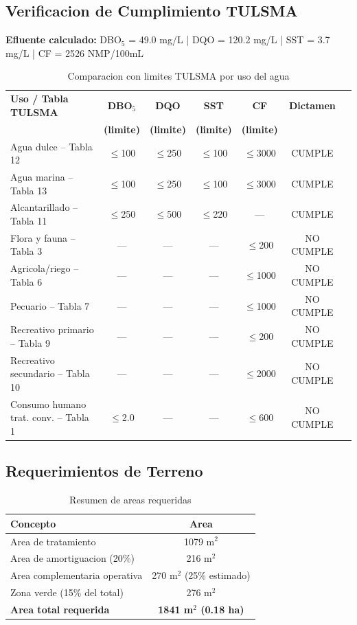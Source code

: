 \documentclass[12pt,a4paper]{article}
\begin{document}
\subsection{Verificacion de Cumplimiento TULSMA}

\textbf{Efluente calculado:} DBO$_5$ = 49.0 mg/L | DQO = 120.2 mg/L | SST = 3.7 mg/L | CF = 2526 NMP/100mL

\vspace{0.5em}
\begin{table}[H]
\centering
\small
\caption{Comparacion con limites TULSMA por uso del agua}
\begin{tabular}{lcccccc}
\toprule
\textbf{Uso / Tabla TULSMA} & \textbf{DBO$_5$} & \textbf{DQO} & \textbf{SST} & \textbf{CF} & \textbf{Dictamen} \\
& \textbf{(limite)} & \textbf{(limite)} & \textbf{(limite)} & \textbf{(limite)} & \\
\midrule
Agua dulce -- Tabla 12 & $\leq$100 & $\leq$250 & $\leq$100 & $\leq$3000 & CUMPLE \\
Agua marina -- Tabla 13 & $\leq$100 & $\leq$250 & $\leq$100 & $\leq$3000 & CUMPLE \\
Alcantarillado -- Tabla 11 & $\leq$250 & $\leq$500 & $\leq$220 & --- & CUMPLE \\
Flora y fauna -- Tabla 3 & --- & --- & --- & $\leq$200 & NO CUMPLE \\
Agricola/riego -- Tabla 6 & --- & --- & --- & $\leq$1000 & NO CUMPLE \\
Pecuario -- Tabla 7 & --- & --- & --- & $\leq$1000 & NO CUMPLE \\
Recreativo primario -- Tabla 9 & --- & --- & --- & $\leq$200 & NO CUMPLE \\
Recreativo secundario -- Tabla 10 & --- & --- & --- & $\leq$2000 & NO CUMPLE \\
Consumo humano trat. conv. -- Tabla 1 & $\leq$2.0 & --- & --- & $\leq$600 & NO CUMPLE \\
\bottomrule
\end{tabular}
\end{table}

\subsection{Requerimientos de Terreno}

\begin{table}[H]
\centering
\caption{Resumen de areas requeridas}
\begin{tabular}{lc}
\toprule
\textbf{Concepto} & \textbf{Area} \\
\midrule
Area de tratamiento & 1079 m$^2$ \\
Area de amortiguacion (20\%) & 216 m$^2$ \\
Area complementaria operativa & 270 m$^2$ (25\% estimado) \\
Zona verde (15\% del total) & 276 m$^2$ \\
\midrule
\textbf{Area total requerida} & \textbf{1841 m$^2$ (0.18 ha)} \\
\bottomrule
\end{tabular}
\end{table}
\end{document}
